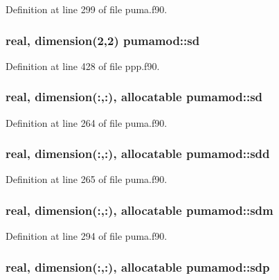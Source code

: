 \-Definition at line 299 of file puma.\-f90.

\hypertarget{classpumamod_a9bd99450c5fc8037436814f7b574e29f}{
\subsubsection[{sd}]{\setlength{\rightskip}{0pt plus 5cm}real, dimension(2,2) {\bf pumamod\-::sd}}}
\label{classpumamod_a9bd99450c5fc8037436814f7b574e29f}


\-Definition at line 428 of file ppp.\-f90.

\hypertarget{classpumamod_a607c73cd3e6556d8dfa4337bb71bad61}{
\subsubsection[{sd}]{\setlength{\rightskip}{0pt plus 5cm}real, dimension(\-:,\-:), allocatable {\bf pumamod\-::sd}}}
\label{classpumamod_a607c73cd3e6556d8dfa4337bb71bad61}


\-Definition at line 264 of file puma.\-f90.

\hypertarget{classpumamod_a4ec415d0ab8671b481436b79bc708c4d}{
\subsubsection[{sdd}]{\setlength{\rightskip}{0pt plus 5cm}real, dimension(\-:,\-:), allocatable {\bf pumamod\-::sdd}}}
\label{classpumamod_a4ec415d0ab8671b481436b79bc708c4d}


\-Definition at line 265 of file puma.\-f90.

\hypertarget{classpumamod_a4285b7b3267876729285e16aca07035e}{
\subsubsection[{sdm}]{\setlength{\rightskip}{0pt plus 5cm}real, dimension(\-:,\-:), allocatable {\bf pumamod\-::sdm}}}
\label{classpumamod_a4285b7b3267876729285e16aca07035e}


\-Definition at line 294 of file puma.\-f90.

\hypertarget{classpumamod_aa56f906a0a8233f5a59a2dd2375d7bfe}{
\subsubsection[{sdp}]{\setlength{\rightskip}{0pt plus 5cm}real, dimension(\-:,\-:), allocatable {\bf pumamod\-::sdp}}}
\label{classpumamod_aa56f906a0a8233f5a59a2dd2375d7bfe}


